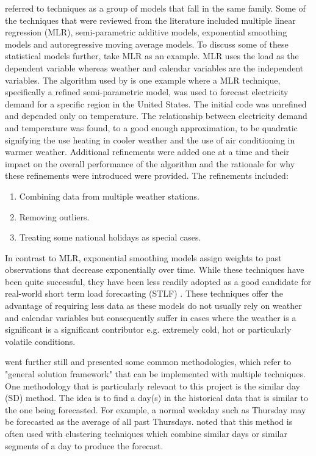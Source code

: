 \citet{hong16} referred to techniques as a group of models that fall in the same family. Some of the techniques that were reviewed from the literature included multiple linear regression (MLR), semi-parametric additive models, exponential smoothing models and autoregressive moving average models. To discuss some of these statistical models further, take MLR as an example. MLR uses the load as the dependent variable whereas weather and calendar variables are the independent variables. The algorithm used by \citet{char14} is one example where a MLR technique, specifically a refined semi-parametric model, was used to forecast electricity demand for a specific region in the United States. The initial code was unrefined and depended only on temperature. The relationship between electricity demand and temperature was found, to a good enough approximation, to be quadratic signifying the use heating in cooler weather and the use of air conditioning in warmer weather. Additional refinements were added one at a time and their impact on the overall performance of the algorithm and the rationale for why these refinements were introduced were provided. The refinements included:
\begin{enumerate}
\item Combining data from multiple weather stations.
\item Removing outliers.
\item Treating some national holidays as special cases.
\end{enumerate}

In contrast to MLR, exponential smoothing models assign weights to past observations that decrease exponentially over time. While these techniques have been quite successful, they have been less readily adopted as a good candidate for real-world short term load forecasting (STLF) \citep{hong16}. These techniques offer the advantage of requiring less data as these models do not usually rely on weather and calendar variables but consequently suffer in cases where the weather is a significant is a significant contributor e.g. extremely cold, hot or particularly volatile conditions.

\citet{hong16} went further still and presented some common methodologies, which refer to "general solution framework" that can be implemented with multiple techniques. One methodology that is particularly relevant to this project is the similar day (SD) method. The idea is to find a day(s) in the historical data that is similar to the one being forecasted. For example, a normal weekday such as Thursday may be forecasted as the average of all past Thursdays. \citet{hong16} noted that this method is often used with clustering techniques which combine similar days or similar segments of a day to produce the forecast.

